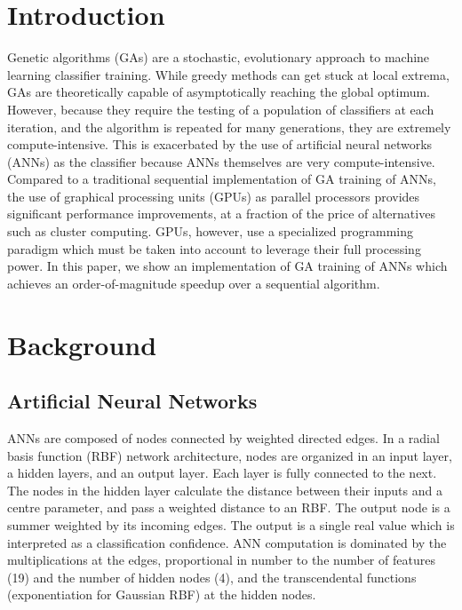 \documentclass[11pt]{article}       %
\begin{document}
\section{Introduction} \label{intro}
Genetic algorithms (GAs) are a stochastic, evolutionary approach to machine learning classifier training. While greedy methods can get stuck at local extrema, GAs  are theoretically capable of asymptotically reaching the global optimum. However, because they require the testing of a population of classifiers at each iteration, and the algorithm is repeated for many generations, they are extremely compute-intensive. This is exacerbated by the use of artificial neural networks (ANNs) as the classifier because ANNs themselves are very compute-intensive. Compared to a traditional sequential implementation of GA training of ANNs, the use of graphical processing units (GPUs) as parallel processors provides significant performance improvements, at a fraction of the price of alternatives such as cluster computing. GPUs, however, use a specialized programming paradigm which must be taken into account to leverage their full processing power. In this paper, we show an implementation of GA training of ANNs which achieves an order-of-magnitude speedup over a sequential algorithm.

\section{Background} \label{background}

\subsection{Artificial Neural Networks} \label{ann}
ANNs are composed of nodes connected by weighted directed edges. In a radial basis function (RBF) network architecture, nodes are organized in an input layer, a hidden layers, and an output layer. Each layer is fully connected to the next. The nodes in the hidden layer calculate the distance between their inputs and a centre parameter, and pass a weighted distance to an RBF. The output node is a summer weighted by its incoming edges. The output is a single real value which is interpreted as a classification confidence. ANN computation is dominated by the multiplications at the edges, proportional in number to the number of features (19) and the number of hidden nodes (4), and the transcendental functions (exponentiation for Gaussian RBF) at the hidden nodes.
\end{document}
